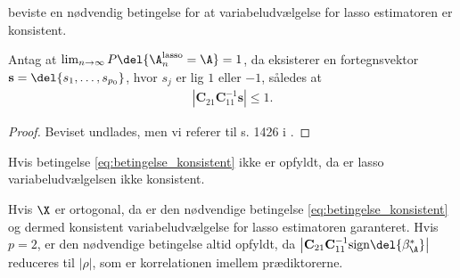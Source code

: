 \cite{adaptive_lasso} beviste en nødvendig betingelse for at variabeludvælgelse for lasso estimatoren er konsistent. 
%
\begin{thm}
Antag at \(\lim_{n \rightarrow \infty} P \del{\A_n^\text{lasso} = \A}=1\), da eksisterer en fortegnsvektor \(\mathbf{s} = \del{s_1, \ldots, s_{p_0}}\), hvor \(s_j\) er lig \(1\) eller \(-1\), således at
\begin{align}
\left\vert \mathbf{C}_{21} \mathbf{C}_{11}^{-1} \mathbf{s} \right\vert \leq 1. \label{eq:betingelse_konsistent}
\end{align}
\end{thm}
%
\begin{proof}
Beviset undlades, men vi referer til s. 1426 i \citep{adaptive_lasso}.
\end{proof}
%
Hvis betingelse \eqref{eq:betingelse_konsistent} ikke er opfyldt, da er lasso variabeludvælgelsen ikke konsistent.
%

Hvis \(\X\) er ortogonal, da er den nødvendige betingelse \eqref{eq:betingelse_konsistent} og dermed konsistent variabeludvælgelse for lasso estimatoren garanteret.
Hvis \(p=2\), er den nødvendige betingelse altid opfyldt, da \(\left\vert \mathbf{C}_{21} \mathbf{C}_{11}^{-1} \text{sign} \del{\beta^*_\A} \right\vert\) reduceres til \(\vert \rho \vert\), som er korrelationen imellem prædiktorerne.




